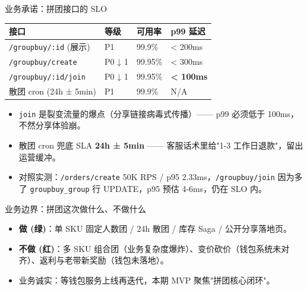 \documentclass[aspectratio=169,11pt]{beamer}
\begin{document}
\begin{frame}[shrink]{业务承诺：拼团接口的 SLO}
\begin{tabular}{@{}llll@{}}
\toprule
接口 & 等级 & 可用率 & p99 延迟 \\
\midrule
\texttt{/groupbuy/:id} (展示) & P1     & 99.9\%  & < 200ms \\
\texttt{/groupbuy/create}     & P0 ↓ 1 & 99.95\% & < 300ms \\
\texttt{/groupbuy/:id/join}   & P0 ↓ 1 & 99.95\% & \textbf{< 100ms} \\
散团 cron (24h ± 5min)        & P1     & 99.9\%  & N/A \\
\bottomrule
\end{tabular}
\vspace{2mm}
\begin{itemize}
  \item \texttt{join} 是裂变流量的爆点（分享链接病毒式传播）—— p99 必须低于 100ms，不然分享体验崩。
  \item 散团 cron 兜底 SLA \textbf{24h ± 5min} —— 客服话术里给"1-3 工作日退款"，留出运营缓冲。
  \item 对照实测：\texttt{/orders/create} 50K RPS / p95 2.33ms，\texttt{/groupbuy/join} 因为多了 \texttt{groupbuy\_group} 行 UPDATE，p95 预估 4-6ms，仍在 SLO 内。
\end{itemize}
\end{frame}

\begin{frame}[shrink]{业务边界：拼团这次做什么、不做什么}
\vspace{2mm}
\begin{itemize}
  \item \textbf{做 (绿)}：单 SKU 固定人数团 / 24h 散团 / 库存 Saga / 公开分享落地页。
  \item \textbf{不做 (红)}：多 SKU 组合团（业务复杂度爆炸）、变价砍价（钱包系统未对齐）、返利与老带新奖励（钱包未落地）。
  \item 业务诚实：等钱包服务上线再迭代，本期 MVP 聚焦"拼团核心闭环"。
\end{itemize}
\end{frame}
\end{document}
